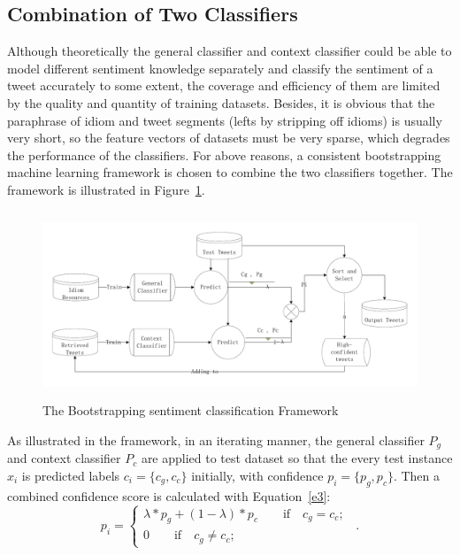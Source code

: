 \documentclass{llncs}
\begin{document}
\subsection{Combination of Two Classifiers}
\label{combination}

Although theoretically the general classifier and context classifier could be able to model different sentiment knowledge separately and classify the sentiment of a tweet accurately to some extent, the coverage and efficiency of them are limited by the quality and quantity of training datasets. 
Besides, it is obvious that the paraphrase of idiom and tweet segments (lefts by stripping off idioms) is usually very short, so the feature vectors of datasets must be very sparse, which degrades the performance of the classifiers. 
For above reasons, a consistent bootstrapping machine learning framework is chosen to combine the two classifiers together. 
The framework is illustrated in Figure~\ref{fig1}. 
\begin{figure} 
\centering%
\includegraphics[width=5.0in,height=2.2in]{itse13p.pdf}
\caption{The Bootstrapping sentiment classification Framework}
\label{fig1}
\end{figure}
As illustrated in the framework, in an iterating manner, the general classifier $ P_{g} $ and context classifier $ P_{c} $ are applied to test dataset so that the every test instance $ x_{i} $ is predicted labels $ c_{i}=\lbrace c_{g},c_{c}\rbrace $ initially, with confidence $ p_{i}= \lbrace p_{g},p_{c}\rbrace$. 
Then a combined confidence score is calculated with Equation~\ref{e3}:
\begin{equation}
\label{e3}
p_{i}=\left\{
\begin{array}{rcl}
\lambda\ast p_{g} + \left( 1-\lambda \right) \ast p_{c} \qquad \mbox{if} \quad c_{g}=c_{c};\\
0 \qquad \mbox{if} \quad c_{g} \neq c_{c};
\end{array}
\right. \enspace .
\end{equation}
\end{document}
